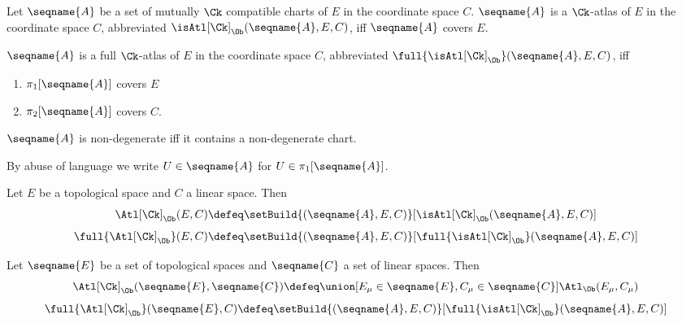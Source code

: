 \documentclass{article}
\begin{document}
\begin{definition}
\label{def:Ck-atlas}
Let $\seqname{A}$ be a set of mutually $\Ck$ compatible charts of $E$ in
the coordinate space $C$. $\seqname{A}$ is a $\Ck$-atlas of $E$ in
the coordinate space $C$, abbreviated
$\isAtl[\Ck]_\Ob(\seqname{A}, E, C)$, iff $\seqname{A}$ covers $E$.

$\seqname{A}$ is a full $\Ck$-atlas of $E$ in
the coordinate space $C$, abbreviated
$\full{\isAtl[\Ck]_\Ob}(\seqname{A}, E, C)$, iff
\begin{enumerate}
\item $\pi_1[\seqname{A}]$ covers $E$
\item $\pi_2[\seqname{A}]$ covers $C$.
\end{enumerate}

$\seqname{A}$ is non-degenerate iff it contains a non-degenerate chart.

By abuse of language we write $U \in \seqname{A}$ for
$U \in \pi_1[\seqname{A}]$.

Let $E$ be a topological space and $C$ a linear space. Then
\begin{equation}
\Atl[\Ck]_\Ob(E,C) \defeq
\setBuild
{{
  (\seqname{A}, E, C)
}}%
[
  {{
    \isAtl[\Ck]_\Ob(\seqname{A}, E, C}
  )}
]
\end{equation}
\begin{equation}
\full{\Atl[\Ck]_\Ob}(E,C) \defeq
\setBuild
{{
  (\seqname{A}, E, C)
}}%
[
  {{
    \full{\isAtl[\Ck]_\Ob}(\seqname{A}, E, C}
  )}
]
\end{equation}

Let $\seqname{E}$ be a set of topological spaces and $\seqname{C}$ a
set of linear spaces. Then
\begin{equation}
\Atl[\Ck]_\Ob(\seqname{E}, \seqname{C}) \defeq
  \union
    [
        {E_\mu \in \seqname{E}},
        {C_\mu \in \seqname{C}}
    ]
    {{
      \Atl_\Ob(E_\mu, C_\mu)
    }}
\end{equation}
\begin{equation}
\full{\Atl[\Ck]_\Ob}(\seqname{E}, C) \defeq
\setBuild
{{
  (\seqname{A}, E, C)
}}%
[
  {{
    \full{\isAtl[\Ck]_\Ob}(\seqname{A}, E, C}
  )}
]
\end{equation}
\end{definition}
\end{document}
